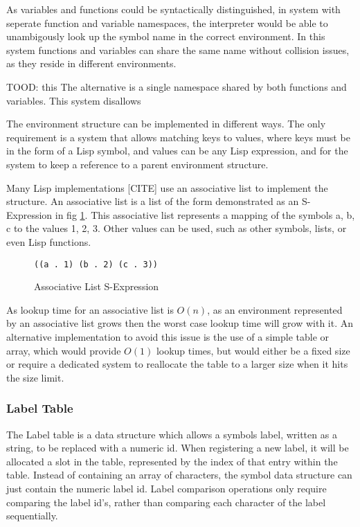 \documentclass[11pt]{report}
\begin{document}
As variables and functions could be syntactically distinguished, in system with seperate function and variable namespaces, the interpreter would be able to unambigously look up the symbol name in the correct environment. In this system functions and variables can share the same name without collision issues, as they reside in different environments.

TOOD: this
The alternative is a single namespace shared by both functions and variables. This system disallows

The environment structure can be implemented in different ways. The only requirement is a system that allows matching keys to values, where keys must be in the form of a Lisp symbol, and values can be any Lisp expression, and for the system to keep a reference to a parent environment structure.

Many Lisp implementations [CITE] use an associative list to implement the structure. An associative list is a list of the form demonstrated as an S-Expression in fig \ref{fig:alist}. This associative list represents a mapping of the symbols {a, b, c} to the values {1, 2, 3}. Other values can be used, such as other symbols, lists, or even Lisp functions. 

\begin{figure}[h]
  \centering
  \texttt{((a . 1) (b . 2) (c . 3))}
  \caption{Associative List S-Expression}
  \label{fig:alist}
\end{figure}

As lookup time for an associative list is $O(n)$, as an environment represented by an associative list grows then the worst case lookup time will grow with it. An alternative implementation to avoid this issue is the use of a simple table or array, which would provide $O(1)$ lookup times, but would either be a fixed size or require a dedicated system to reallocate the table to a larger size when it hits the size limit.

\subsubsection{Label Table}
The Label table is a data structure which allows a symbols label, written as a string, to be replaced with a numeric id. When registering a new label, it will be allocated a slot in the table, represented by the index of that entry within the table. Instead of containing an array of characters, the symbol data structure can just contain the numeric label id. Label comparison operations only require comparing the label id's, rather than comparing each character of the label sequentially.
\end{document}
